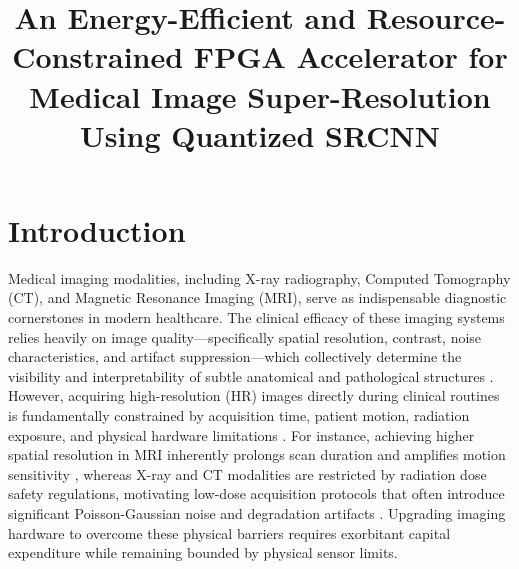 \documentclass[conference]{IEEEtran}
\begin{document}

\title{An Energy-Efficient and Resource-Constrained FPGA Accelerator for Medical Image Super-Resolution Using Quantized SRCNN}

\author{
}
\maketitle
\section{Introduction}

Medical imaging modalities, including X-ray radiography, Computed Tomography (CT), and Magnetic Resonance Imaging (MRI), serve as indispensable diagnostic cornerstones in modern healthcare. The clinical efficacy of these imaging systems relies heavily on image quality---specifically spatial resolution, contrast, noise characteristics, and artifact suppression---which collectively determine the visibility and interpretability of subtle anatomical and pathological structures \cite{obuchowicz2026image, palma2021review}. However, acquiring high-resolution (HR) images directly during clinical routines is fundamentally constrained by acquisition time, patient motion, radiation exposure, and physical hardware limitations \cite{chen2023deep, shin2024super, occhipinti2026ultra}. For instance, achieving higher spatial resolution in MRI inherently prolongs scan duration and amplifies motion sensitivity \cite{chen2023deep}, whereas X-ray and CT modalities are restricted by radiation dose safety regulations, motivating low-dose acquisition protocols that often introduce significant Poisson-Gaussian noise and degradation artifacts \cite{shin2024super, occhipinti2026ultra}. Upgrading imaging hardware to overcome these physical barriers requires exorbitant capital expenditure while remaining bounded by physical sensor limits.
\end{document}
